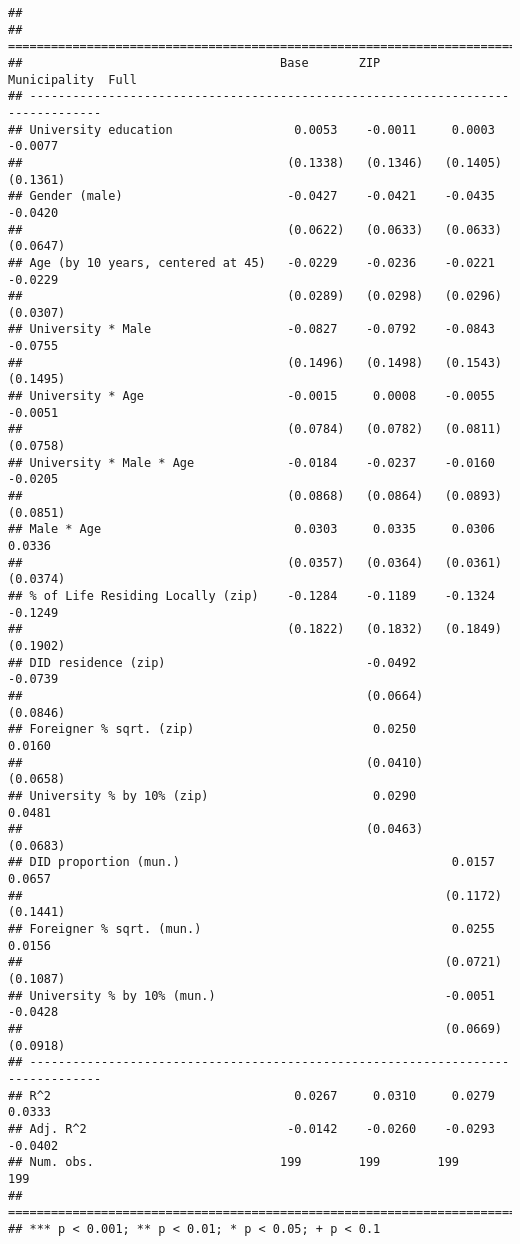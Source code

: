 \documentclass[
]{article}
\begin{document}
\begin{verbatim}
## 
## ================================================================================
##                                    Base       ZIP        Municipality  Full     
## --------------------------------------------------------------------------------
## University education                 0.0053    -0.0011     0.0003       -0.0077 
##                                     (0.1338)   (0.1346)   (0.1405)      (0.1361)
## Gender (male)                       -0.0427    -0.0421    -0.0435       -0.0420 
##                                     (0.0622)   (0.0633)   (0.0633)      (0.0647)
## Age (by 10 years, centered at 45)   -0.0229    -0.0236    -0.0221       -0.0229 
##                                     (0.0289)   (0.0298)   (0.0296)      (0.0307)
## University * Male                   -0.0827    -0.0792    -0.0843       -0.0755 
##                                     (0.1496)   (0.1498)   (0.1543)      (0.1495)
## University * Age                    -0.0015     0.0008    -0.0055       -0.0051 
##                                     (0.0784)   (0.0782)   (0.0811)      (0.0758)
## University * Male * Age             -0.0184    -0.0237    -0.0160       -0.0205 
##                                     (0.0868)   (0.0864)   (0.0893)      (0.0851)
## Male * Age                           0.0303     0.0335     0.0306        0.0336 
##                                     (0.0357)   (0.0364)   (0.0361)      (0.0374)
## % of Life Residing Locally (zip)    -0.1284    -0.1189    -0.1324       -0.1249 
##                                     (0.1822)   (0.1832)   (0.1849)      (0.1902)
## DID residence (zip)                            -0.0492                  -0.0739 
##                                                (0.0664)                 (0.0846)
## Foreigner % sqrt. (zip)                         0.0250                   0.0160 
##                                                (0.0410)                 (0.0658)
## University % by 10% (zip)                       0.0290                   0.0481 
##                                                (0.0463)                 (0.0683)
## DID proportion (mun.)                                      0.0157        0.0657 
##                                                           (0.1172)      (0.1441)
## Foreigner % sqrt. (mun.)                                   0.0255        0.0156 
##                                                           (0.0721)      (0.1087)
## University % by 10% (mun.)                                -0.0051       -0.0428 
##                                                           (0.0669)      (0.0918)
## --------------------------------------------------------------------------------
## R^2                                  0.0267     0.0310     0.0279        0.0333 
## Adj. R^2                            -0.0142    -0.0260    -0.0293       -0.0402 
## Num. obs.                          199        199        199           199      
## ================================================================================
## *** p < 0.001; ** p < 0.01; * p < 0.05; + p < 0.1
\end{verbatim}
\end{document}
